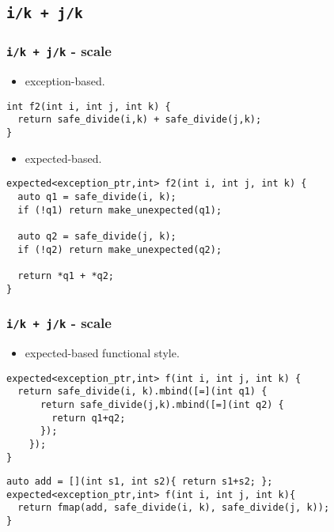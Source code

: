 \documentclass[xcolor=dvipsnames]{beamer}
\newcommand{\cpp}[1]{\lstinline{#1}}
\begin{document}
\subsection{\cpp{i/k + j/k}}
\begin{frame}[fragile]
\frametitle{\cpp{i/k + j/k}  - scale}

\begin{itemize}
  \item exception-based.
\end{itemize}

\begin{lstlisting}
int f2(int i, int j, int k) {
  return safe_divide(i,k) + safe_divide(j,k);
}
\end{lstlisting}

\begin{itemize}
  \item expected-based.
\end{itemize}

\begin{lstlisting}
expected<exception_ptr,int> f2(int i, int j, int k) {
  auto q1 = safe_divide(i, k);
  if (!q1) return make_unexpected(q1);

  auto q2 = safe_divide(j, k);
  if (!q2) return make_unexpected(q2);

  return *q1 + *q2;
}
\end{lstlisting}

\end{frame}
\begin{frame}[fragile]
\frametitle{\cpp{i/k + j/k}  - scale}

\begin{itemize}
  \item expected-based functional style.
\end{itemize}

\begin{lstlisting}
expected<exception_ptr,int> f(int i, int j, int k) {
  return safe_divide(i, k).mbind([=](int q1) {
      return safe_divide(j,k).mbind([=](int q2) {
        return q1+q2;
      });
    });
}
\end{lstlisting}
\begin{lstlisting}
auto add = [](int s1, int s2){ return s1+s2; };
expected<exception_ptr,int> f(int i, int j, int k){
  return fmap(add, safe_divide(i, k), safe_divide(j, k));
}
\end{lstlisting}

\end{frame}
\end{document}

